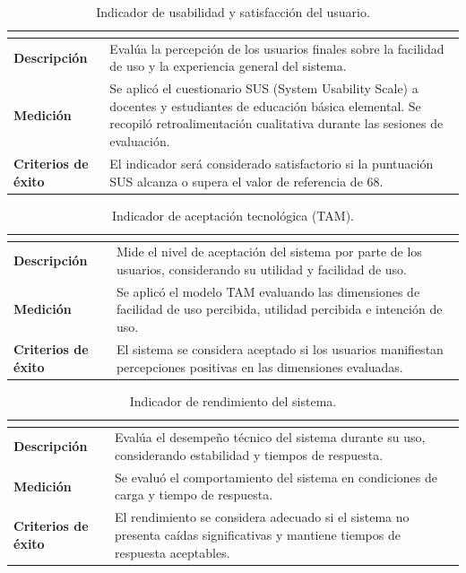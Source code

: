 \begin{table}[H]
\centering
\caption{Indicador de usabilidad y satisfacción del usuario.}
\label{tab:ind_sus}
\footnotesize
\renewcommand{\arraystretch}{1.25}
\begin{tabularx}{\textwidth}{|>{\bfseries}p{3.2cm}|X|}
\hline
\rowcolor{headblue}\multicolumn{2}{|c|}{\textbf{Nivel de satisfacción del usuario}}\\\hline
Descripción & Evalúa la percepción de los usuarios finales sobre la facilidad de uso y la experiencia general del sistema. \\\hline
Medición & Se aplicó el cuestionario SUS (System Usability Scale) a docentes y estudiantes de educación básica elemental. Se recopiló retroalimentación cualitativa durante las sesiones de evaluación. \\\hline
Criterios de éxito & El indicador será considerado satisfactorio si la puntuación SUS alcanza o supera el valor de referencia de 68. \\\hline
\end{tabularx}
\end{table}
\elaboracion

\begin{table}[H]
\centering
\caption{Indicador de aceptación tecnológica (TAM).}
\label{tab:ind_tam}
\footnotesize
\renewcommand{\arraystretch}{1.25}
\begin{tabularx}{\textwidth}{|>{\bfseries}p{3.2cm}|X|}
\hline
\rowcolor{headblue}\multicolumn{2}{|c|}{\textbf{Aceptación tecnológica}}\\\hline
Descripción & Mide el nivel de aceptación del sistema por parte de los usuarios, considerando su utilidad y facilidad de uso. \\\hline
Medición & Se aplicó el modelo TAM evaluando las dimensiones de facilidad de uso percibida, utilidad percibida e intención de uso. \\\hline
Criterios de éxito & El sistema se considera aceptado si los usuarios manifiestan percepciones positivas en las dimensiones evaluadas. \\\hline
\end{tabularx}
\end{table}
\elaboracion

\begin{table}[H]
\centering
\caption{Indicador de rendimiento del sistema.}
\label{tab:ind_rend}
\footnotesize
\renewcommand{\arraystretch}{1.25}
\begin{tabularx}{\textwidth}{|>{\bfseries}p{3.2cm}|X|}
\hline
\rowcolor{headblue}\multicolumn{2}{|c|}{\textbf{Rendimiento técnico}}\\\hline
Descripción & Evalúa el desempeño técnico del sistema durante su uso, considerando estabilidad y tiempos de respuesta. \\\hline
Medición & Se evaluó el comportamiento del sistema en condiciones de carga y tiempo de respuesta. \\\hline
Criterios de éxito & El rendimiento se considera adecuado si el sistema no presenta caídas significativas y mantiene tiempos de respuesta aceptables. \\\hline
\end{tabularx}
\end{table}
\elaboracion

